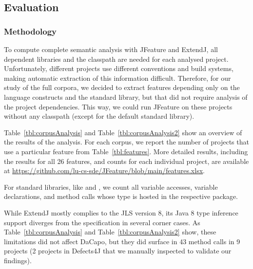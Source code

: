 \subsection{Evaluation}

\subsubsection*{\textbf{Methodology}}
To compute complete semantic analysis with JFeature and ExtendJ, all dependent libraries and the classpath are needed for each analysed project. Unfortunately, different projects use different conventions and build systems, making automatic extraction of this information difficult.
Therefore, for our study of the full corpora, we decided to extract features depending only on the language constructs and the standard library, but that did not require analysis of the project dependencies. This way, we could run JFeature on these projects without any classpath (except for the default standard library).

Table~\ref{tbl:corpusAnalysis} and Table~\ref{tbl:corpusAnalysis2} show an overview of the results of the analysis. For each corpus, we report the number of projects that use a particular feature from Table~\ref{tbl:features}. More detailed results, including the results for all 26 features, and counts for each individual project, are available at \url{https://github.com/lu-cs-sde/JFeature/blob/main/features.xlsx}.

For standard libraries, like  and , we count all variable accesses, variable declarations, and method calls whose type is hosted in the respective package.

While ExtendJ mostly complies to the JLS version 8, its Java 8 type inference support diverges from the specification in several corner cases.
As Table~\ref{tbl:corpusAnalysis} and Table~\ref{tbl:corpusAnalysis2}  show, these limitations did not affect DaCapo, but they did surface in 43 method calls in 9 projects (2 projects in Defects4J that we manually inspected to validate our findings).


